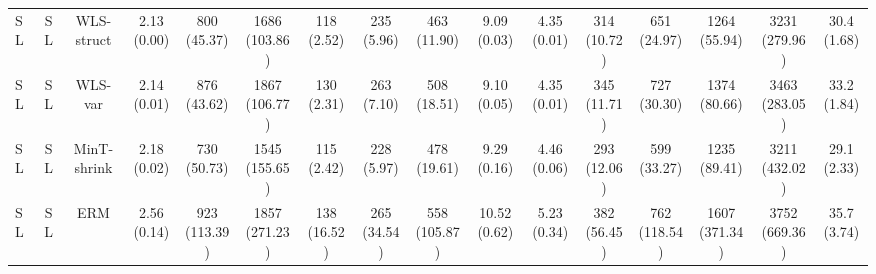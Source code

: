 \documentclass[preprint, 3p, times, twocolumn]{elsarticle}
\begin{document}
\begin{table}
\begin{center}
{{\begin{tabular}{l c cccccccccccccc}
  \hspace{0.1cm} 	SL	&SL	&WLS-struct	&2.13 (0.00)	&800 (45.37)	&1686 (103.86)	&118 (2.52)	&235 (5.96)	&463 (11.90)	&9.09 (0.03)	&4.35 (0.01)	&314 (10.72)	&651 (24.97)	&1264 (55.94)	&3231 (279.96)	&30.4 (1.68)	\\
  \hspace{0.1cm} 	SL	&SL	&WLS-var	&2.14 (0.01)	&876 (43.62)	&1867 (106.77)	&130 (2.31)	&263 (7.10)	&508 (18.51)	&9.10 (0.05)	&4.35 (0.01)	&345 (11.71)	&727 (30.30)	&1374 (80.66)	&3463 (283.05)	&33.2 (1.84)	\\
  \hspace{0.1cm} 	SL	&SL	&MinT-shrink	&2.18 (0.02)	&730 (50.73)	&1545 (155.65)	&115 (2.42)	&228 (5.97)	&478 (19.61)	&9.29 (0.16)	&4.46 (0.06)	&293 (12.06)	&599 (33.27)	&1235 (89.41)	&3211 (432.02)	&29.1 (2.33)	\\
  \hspace{0.1cm} 	SL	&SL	&ERM	&2.56 (0.14)	&923 (113.39)	&1857 (271.23)	&138 (16.52)	&265 (34.54)	&558 (105.87)	&10.52 (0.62)	&5.23 (0.34)	&382 (56.45)	&762 (118.54)	&1607 (371.34)	&3752 (669.36)	&35.7 (3.74)	\\
  
  \bottomrule
  
\end{tabular}}}
  \end{center}
  \end{table}
\end{document}
